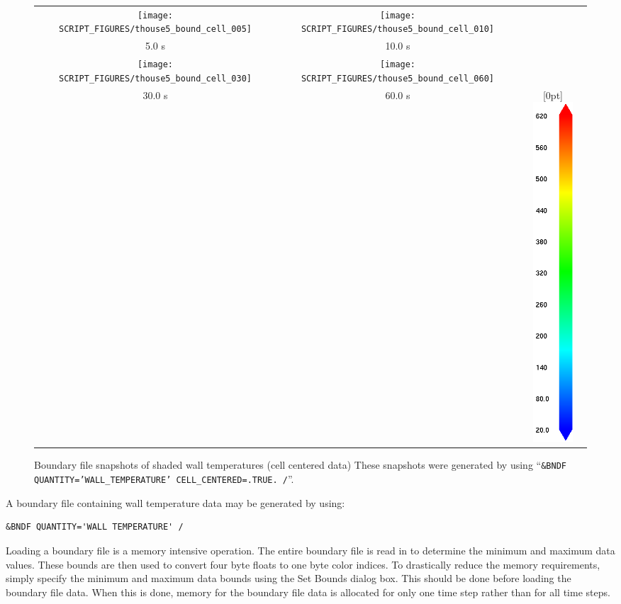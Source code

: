 \documentclass[11pt,twoside]{book}
\begin{document}
\begin{figure}[bph]
\begin{center}
\begin{tabular}{ccc}
\texttt{[image: SCRIPT\_FIGURES/thouse5\_bound\_cell\_005]}&
\texttt{[image: SCRIPT\_FIGURES/thouse5\_bound\_cell\_010]}\\
5.0 s&10.0 s\\
\texttt{[image: SCRIPT\_FIGURES/thouse5\_bound\_cell\_030]}&
\texttt{[image: SCRIPT\_FIGURES/thouse5\_bound\_cell\_060]}\\
30.0 s&60.0 s
&\raisebox{0.0ex}[0pt]{\includegraphics[height=5.0in]{FIGURES/colorbar_20_620}}\\
\end{tabular}
\end{center}
\caption [Boundary file snapshots of shaded wall temperatures
contours (cell centered data).] {Boundary file snapshots of shaded
wall temperatures (cell centered data) These snapshots were
generated by using ``{\tt\&BNDF QUANTITY='WALL\_TEMPERATURE'
CELL\_CENTERED=.TRUE. /}''. }
\label{figboundary_cell_centered}%
\end{figure}
A boundary file containing wall temperature data may be generated
by using:
\begin{lstlisting}
&BNDF QUANTITY='WALL TEMPERATURE' /
\end{lstlisting}
Loading a boundary file is a memory intensive operation.  The
entire boundary file is read in to determine the minimum and
maximum data values.  These bounds are then used to convert four
byte floats to one byte color indices.  To drastically reduce the
memory requirements, simply specify the minimum and maximum data
bounds using the Set Bounds dialog box.  This should be
done before loading the boundary file data.  When this is done,
memory for the boundary file data is allocated for only one time
step rather than for all time steps.
\end{document}
